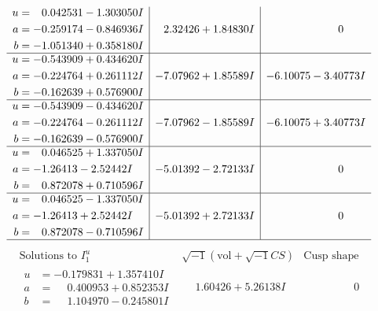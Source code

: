 \documentclass[1p]{elsarticle_modified}
\theoremstyle{definition}
\newcommand{\I}{\sqrt{-1}}
\begin{document}
$$\begin{array}{c|c|c}
\begin{aligned}
u &= \phantom{-}0.042531 - 1.303050 I \\
a &= -0.259174 - 0.846936 I \\
b &= -1.051340 + 0.358180 I\end{aligned}
 & \phantom{-}2.32426 + 1.84830 I & \phantom{-0.000000 } 0 \\ \hline\begin{aligned}
u &= -0.543909 + 0.434620 I \\
a &= -0.224764 + 0.261112 I \\
b &= -0.162639 + 0.576900 I\end{aligned}
 & -7.07962 + 1.85589 I & -6.10075 - 3.40773 I \\ \hline\begin{aligned}
u &= -0.543909 - 0.434620 I \\
a &= -0.224764 - 0.261112 I \\
b &= -0.162639 - 0.576900 I\end{aligned}
 & -7.07962 - 1.85589 I & -6.10075 + 3.40773 I \\ \hline\begin{aligned}
u &= \phantom{-}0.046525 + 1.337050 I \\
a &= -1.26413 - 2.52442 I \\
b &= \phantom{-}0.872078 + 0.710596 I\end{aligned}
 & -5.01392 - 2.72133 I & \phantom{-0.000000 } 0 \\ \hline\begin{aligned}
u &= \phantom{-}0.046525 - 1.337050 I \\
a &= -1.26413 + 2.52442 I \\
b &= \phantom{-}0.872078 - 0.710596 I\end{aligned}
 & -5.01392 + 2.72133 I & \phantom{-0.000000 } 0\\
 \hline 
 \end{array}$$\newpage$$\begin{array}{c|c|c}  
\text{Solutions to }I^u_{1}& \I (\text{vol} + \sqrt{-1}CS) & \text{Cusp shape}\\
 \hline 
\begin{aligned}
u &= -0.179831 + 1.357410 I \\
a &= \phantom{-}0.400953 + 0.852353 I \\
b &= \phantom{-}1.104970 - 0.245801 I\end{aligned}
 & \phantom{-}1.60426 + 5.26138 I & \phantom{-0.000000 } 0 \\ \hline\begin{aligned}

\end{aligned}
\end{array}$$
\end{document}
